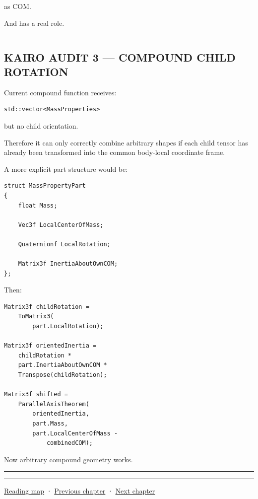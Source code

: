 as COM.

And  has a real role.

\begin{center}\rule{0.5\linewidth}{0.5pt}\end{center}

\subsection{KAIRO AUDIT 3 --- COMPOUND CHILD ROTATION}\label{06-engine-ii-ch035-kairo-audit-3-compound-child-rotation}

\hypertarget{06-engine-ii-ch035-kairo-audit-3-compound-child-rotation}{}

Current compound function receives:

\begin{verbatim}
std::vector<MassProperties>
\end{verbatim}

but no child orientation.

Therefore it can only correctly combine arbitrary shapes if each child tensor has already been transformed into the common body-local coordinate frame.

A more explicit part structure would be:

\begin{verbatim}
struct MassPropertyPart
{
    float Mass;

    Vec3f LocalCenterOfMass;

    Quaternionf LocalRotation;

    Matrix3f InertiaAboutOwnCOM;
};
\end{verbatim}

Then:

\begin{verbatim}
Matrix3f childRotation =
    ToMatrix3(
        part.LocalRotation);

Matrix3f orientedInertia =
    childRotation *
    part.InertiaAboutOwnCOM *
    Transpose(childRotation);

Matrix3f shifted =
    ParallelAxisTheorem(
        orientedInertia,
        part.Mass,
        part.LocalCenterOfMass -
            combinedCOM);
\end{verbatim}

Now arbitrary compound geometry works.

\begin{center}\rule{0.5\linewidth}{0.5pt}\end{center}

\begin{center}\rule{0.5\linewidth}{0.5pt}\end{center}

\hyperref[volume-reading-map]{Reading map} · \hyperref[06-engine-ii-ch034-rigid-body-motion-from-forces-to-contact]{Previous chapter} · \hyperref[06-engine-ii-ch036-auditing-capsule-mass-properties-and-collision-formulas]{Next chapter}
